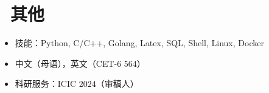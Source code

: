 \documentclass{resume}
\begin{document}



\section{\faCogs\ 其他}
\begin{itemize}[parsep=0.5ex]
  \item 技能：Python, C/C++, Golang, Latex, SQL, Shell, Linux, Docker
  \item 中文（母语），英文（CET-6 564）
  \item 科研服务：ICIC 2024（审稿人）
\end{itemize}

%
%
\end{document}
